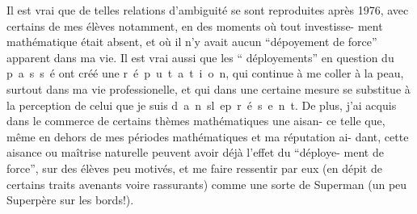 Il est vrai que de telles relations d'ambiguité se sont reproduites après
1976, avec certains de mes élèves notamment, en des moments où tout investisse-\linebreak
ment mathématique était absent, et où il n'y avait aucun ``dépoyement de force''
apparent dans ma vie. Il est vrai aussi que les `` déployements'' en question du
\mbox{p a s s é} ont créé une \mbox{r é p u t a t i o n}, qui continue à me coller à la
peau, surtout dans ma vie professionelle, et qui dans une certaine mesure se\inserted{\unsure{,}}
substitue à la perception de celui que je suis \mbox{d a n s\quad l e\quad p r é s e n t}.
De plus, j'ai acquis dans le commerce de certains thèmes mathématiques une aisan-\linebreak
ce telle que, même en dehors de mes périodes mathématiques et ma réputation ai-\linebreak
dant, cette aisance ou maîtrise naturelle peuvent avoir déjà l'effet du ``déploye-\linebreak
ment de force'', sur des élèves peu motivés, et me faire ressentir par eux (en
dépit de certains traits avenants voire rassurants) comme une sorte de Superman
(un peu Superpère sur les bords!).
\margin{\unsure{-}}

